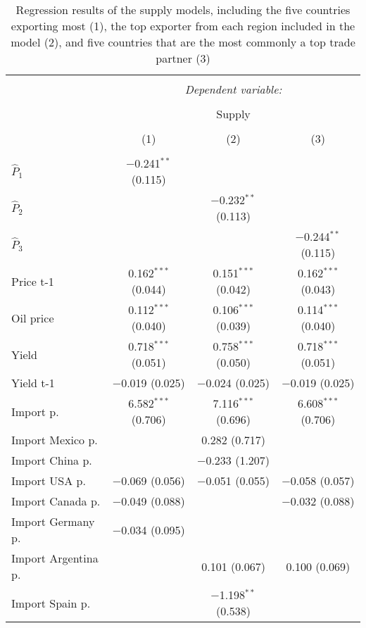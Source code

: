 
\begin{table}[H] \centering 
  \caption{Regression results of the supply models, including the five countries exporting most (1), the top exporter from each region included in the model (2), and five countries that are the most commonly a top trade partner (3)} 
  \label{table:table_supply} 
\scriptsize 
\begin{tabular}{@{\extracolsep{5pt}}lccc} 
\\[-1.8ex]\hline 
\hline \\[-1.8ex] 
 & \multicolumn{3}{c}{\textit{Dependent variable:}} \\ 
\cline{2-4} 
\\[-1.8ex] & \multicolumn{3}{c}{Supply} \\ 
\\[-1.8ex] & (1) & (2) & (3)\\ 
\hline \\[-1.8ex] 
 $\hat{P}_{1}$ & $-$0.241$^{**}$ (0.115) &  &  \\ 
  $\hat{P}_{2}$ &  & $-$0.232$^{**}$ (0.113) &  \\ 
  $\hat{P}_{3}$ &  &  & $-$0.244$^{**}$ (0.115) \\ 
  Price t-1 & 0.162$^{***}$ (0.044) & 0.151$^{***}$ (0.042) & 0.162$^{***}$ (0.043) \\ 
  Oil price & 0.112$^{***}$ (0.040) & 0.106$^{***}$ (0.039) & 0.114$^{***}$ (0.040) \\ 
  Yield & 0.718$^{***}$ (0.051) & 0.758$^{***}$ (0.050) & 0.718$^{***}$ (0.051) \\ 
  Yield t-1 & $-$0.019 (0.025) & $-$0.024 (0.025) & $-$0.019 (0.025) \\ 
  Import p. & 6.582$^{***}$ (0.706) & 7.116$^{***}$ (0.696) & 6.608$^{***}$ (0.706) \\ 
  Import Mexico p. &  & 0.282 (0.717) &  \\ 
  Import China p. &  & $-$0.233 (1.207) &  \\ 
  Import USA p. & $-$0.069 (0.056) & $-$0.051 (0.055) & $-$0.058 (0.057) \\ 
  Import Canada p. & $-$0.049 (0.088) &  & $-$0.032 (0.088) \\ 
  Import Germany p. & $-$0.034 (0.095) &  &  \\ 
  Import Argentina p. &  & 0.101 (0.067) & 0.100 (0.069) \\ 
  Import Spain p. &  & $-$1.198$^{**}$ (0.538) &  \\ 

\end{tabular}
\end{table}
